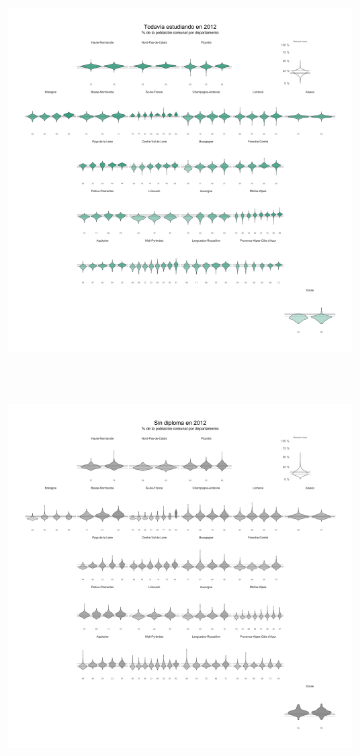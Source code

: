 \begin{figure}[h]
	\centering
	\begin{subfigure}{0.3\textwidth}
	\includegraphics[width = \textwidth]{Figs/AED/Geofacet_Distr_por_Dpto_Esc_2012}
	\end{subfigure}
	~
	\begin{subfigure}{0.3\textwidth}
	\includegraphics[width = \textwidth]{Figs/AED/Geofacet_Distr_por_Dpto_Dip1_2012}

\end{subfigure}
\end{figure}
